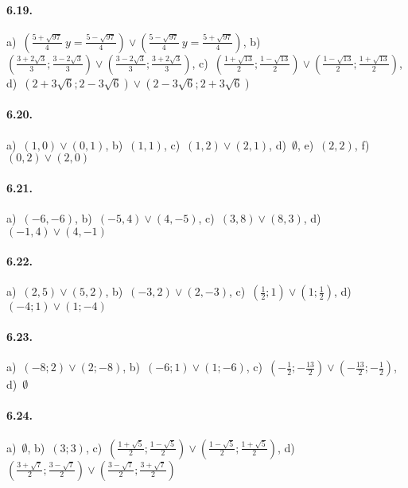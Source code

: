 \paragraph{6.19.} 
a)~\(\left(\frac{5+\sqrt{97}} 4~y=\frac{5-\sqrt{97}} 4\right)\vee 
\left(\frac{5-\sqrt{97}} 4~y=\frac{5+\sqrt{97}} 4\right)\),\quad 
b)~\(\left(\frac{3+{2\sqrt 3}} 3;\frac {3-{2\sqrt 3}} 3\right) \vee 
\left(\frac {3-{2\sqrt 3}} 3;\frac{3+{2\sqrt 3}} 3\right)\),\quad 
c)~\(\left(\frac{1+\sqrt{13}} 2;\frac{1-\sqrt{13}} 2\right)\vee 
\left(\frac{1-\sqrt{13}} 2;\frac{1+\sqrt{13}} 2\right)\),\quad 
d)~\(\left(2+3\sqrt 6;2-3\sqrt 6\right)\vee \left(2-3\sqrt 6;2+3
\sqrt 6\right)\)

\paragraph{6.20.} 
a)~\((1,0)\vee(0,1)\),\quad 
b)~\((1,1)\),\quad 
c)~\((1,2)\vee(2,1)\),\quad 
d)~\(\emptyset\),\quad 
e)~\((2,2)\),\quad 
f)~\((0,2)\vee(2,0)\)

\paragraph{6.21.} 
a)~\((-6,-6)\),\quad 
b)~\((-5,4)\vee(4,-5)\),\quad 
c)~\((3,8)\vee(8,3)\),\quad 
d)~\((-1,4)\vee(4,-1)\)

\paragraph{6.22.} 
a)~\((2,5)\vee(5,2)\),\quad 
b)~\((-3,2)\vee(2,-3)\),\quad 
c)~\((\frac 1 2;1)\vee(1;\frac 1 2)\),\quad 
d)~\((-4;1)\vee(1;-4)\)

\paragraph{6.23.} 
a)~\((-8;2)\vee(2;-8)\),\quad 
b)~\((-6;1)\vee(1;-6)\),\quad 
c)~\(\left(-\frac 1 2;-\frac{13} 2\right)\vee \left(-\frac{13} 2;
-\frac 1 2\right)\),\quad 
d)~\(\emptyset \)

\paragraph{6.24.} 
a)~\(\emptyset \),\; 
b)~\((3;3)\),\; 
c)~\(\left(\frac{1+\sqrt 5} 2;\frac{1-\sqrt 
5} 2\right)\vee \left(\frac{1-\sqrt 5} 2;\frac{1+\sqrt 5} 2\right)\),\; 
d)~\(\left(\frac{3+\sqrt 7} 2;\frac{3-\sqrt 7} 2\right)\vee \left(\frac{3-
\sqrt 7} 2;\frac{3+\sqrt 7} 2\right)\)

